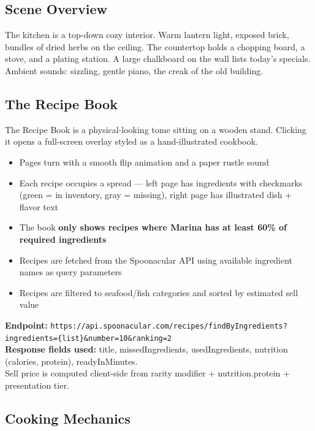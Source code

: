 \documentclass[11pt, letterpaper]{article}
\begin{document}
\subsection{Scene Overview}

The kitchen is a top-down cozy interior. Warm lantern light, exposed brick, bundles of dried herbs on the ceiling. The countertop holds a chopping board, a stove, and a plating station. A large chalkboard on the wall lists today's specials. Ambient sounds: sizzling, gentle piano, the creak of the old building.

\subsection{The Recipe Book}

The Recipe Book is a physical-looking tome sitting on a wooden stand. Clicking it opens a full-screen overlay styled as a hand-illustrated cookbook.

\begin{itemize}
  \item Pages turn with a smooth flip animation and a paper rustle sound
  \item Each recipe occupies a spread --- left page has ingredients with checkmarks (green = in inventory, gray = missing), right page has illustrated dish + flavor text
  \item The book \textbf{only shows recipes where Marina has at least 60\% of required ingredients}
  \item Recipes are fetched from the Spoonacular API using available ingredient names as query parameters
  \item Recipes are filtered to seafood/fish categories and sorted by estimated sell value
\end{itemize}

\begin{purplebox}
\textbf{Endpoint:} \texttt{https://api.spoonacular.com/recipes/findByIngredients?ingredients=\{list\}\&number=10\&ranking=2}\\[4pt]
\textbf{Response fields used:} title, missedIngredients, usedIngredients, nutrition (calories, protein), readyInMinutes.\\[2pt]
Sell price is computed client-side from rarity modifier + nutrition.protein + presentation tier.
\end{purplebox}

\subsection{Cooking Mechanics}
\end{document}
